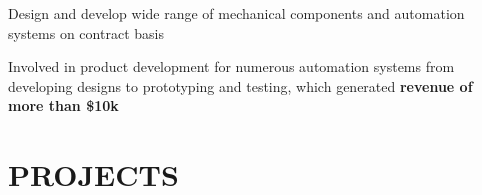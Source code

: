 \documentclass[letterpaper]{deedy-resume}
\begin{document}
\begin{center}
\begin{minipage}[t]{0.66\textwidth}
\vspace{\topsep}
\begin{tightitemize}
\item Design and develop wide range of mechanical components and automation systems on contract basis 
\vspace{1mm}
\item Involved in product development for numerous automation systems from developing designs to prototyping and testing, which generated \textbf{revenue of more than \$10k}
\vspace{1mm}
\end{tightitemize}



\section{PROJECTS}
\sectionspace

 

\end{minipage}
\end{center}
\end{document}
